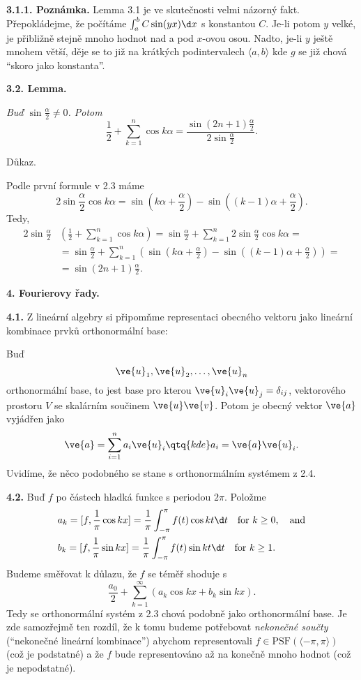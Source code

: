 \documentclass[12pt]{article}
\begin{document}
\medskip

{\bf 3.1.1. Poznámka.} Lemma 3.1
je ve skutečnosti velmi názorný fakt. Přepokládejme, že počítáme $\int_a^b C\sin (yx) \d x$ s konstantou $C$. Je-li potom $y$ velké, je
přibližně stejně mnoho hodnot  nad a pod  $x$-ovou osou.
Nadto, je-li  $y$ ještě mnohem větší, děje se to již na krátkých podintervalech $\langle a,b\rangle$ kde $g$ se již chová ``skoro jako konstanta''.

\bigskip

{\bf 3.2. Lemma.} {\em Buď $\sin\frac{\alpha}{2}\neq 0$. Potom
$$
\frac12+\sum_{k=1}^n \cos k\alpha=\frac{\sin(2n+1)\frac{\alpha}{2}}{2\sin\frac{\alpha}{2}}.
$$

Důkaz.} Podle první formule v 2.3 máme
$$
2\sin\frac\alpha{2}\cos k\alpha=\sin\left(k\alpha+\frac{\alpha}2\right)-
\sin\left((k-1)\alpha+\frac{\alpha}2\right).
$$
Tedy,
$$
\begin{aligned}
2\sin\frac{\alpha}2&\left(\frac12+\sum_{k=1}^n \cos k\alpha\right)=
\sin\frac{\alpha}2 +\sum_{k=1}^n 2\sin\frac\alpha{2} \cos k\alpha=\\
&=\sin\frac{\alpha}2 +\sum_{k=1}^n \left(\sin\left(k\alpha+\frac{\alpha}2\right)-
\sin\left((k-1)\alpha+\frac{\alpha}2\right)\right)=\\ 
&=\sin(2n+1)\frac{\alpha}2.
\end{aligned}
$$
\sq


\vskip10mm

 {\large\bf 4. Fourierovy řady.}

\bigskip

{\bf 4.1.} Z lineární algebry si připomňme representaci obecného vektoru jako lineární kombinace prvků orthonormální base:

 Buď 
$$
\ve{u}_1,\ve{u}_2,\dots,\ve{u}_n
$$
orthonormální base, to jest base pro kterou $\ve{u}_i\ve{u}_j=\delta_{ij}$, vektorového prostoru $V$ se skalárním součinem $\ve{u}\ve{v}$. Potom je obecný vektor $\ve{a}$ vyjádřen jako
$$
\ve{a}=\sum_{i=1}^na_i\ve{u}_i \qtq{kde} a_i=\ve{a}\ve{u}_i.
$$
Uvidíme, že něco podobného se stane s orthonormálním systémem z 2.4.

\bigskip

{\bf 4.2.} Buď $f$ po částech hladká funkce s periodou $2\pi$. Položme 
$$
\begin{aligned}
&a_k=[f,\frac1\pi\cos kx]=\frac1{\pi}\int_{-\pi}^{\pi}f(t)\cos kt\d t \quad \text{for}\ k\geq 0, \ \ \ \text{and}\\
&b_k=[f,\frac1\pi\sin kx]=\frac1{\pi}\int_{-\pi}^{\pi}f(t)\sin kt\d t \quad \text{for}\ k\geq 1.
\end{aligned}
$$
Budeme směřovat k   důlazu, že $f$ se téměř shoduje s
$$
\frac{a_0}{2}+\sum_{k=1}^\infty(a_k\cos kx+ b_k\sin kx).
$$
Tedy se orthonormální systém z 2.3 chová podobně jako orthonormální base. Je zde samozřejmě ten rozdíl, že k tomu budeme potřebovat 
 {\em nekonečné součty} (``nekonečné lineární kombinace'') abychom representovali $f\in\text{PSF}(\langle-\pi,\pi\rangle)$ (což je podstatné) a že $f$ bude representováno až na konečně mnoho hodnot (což je nepodstatné).
\end{document}
